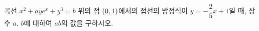 곡선 $x^2+aye^x+y^3=b$ 위의 점 $(0{,}\mkern3mu\mathopen{}1)$에서의 접선의 방정식이 $y=-\dfrac{2}{5}x+1$일 때, 상수 $a$, $b$에 대하여 $ab$의 값을 구하시오.
